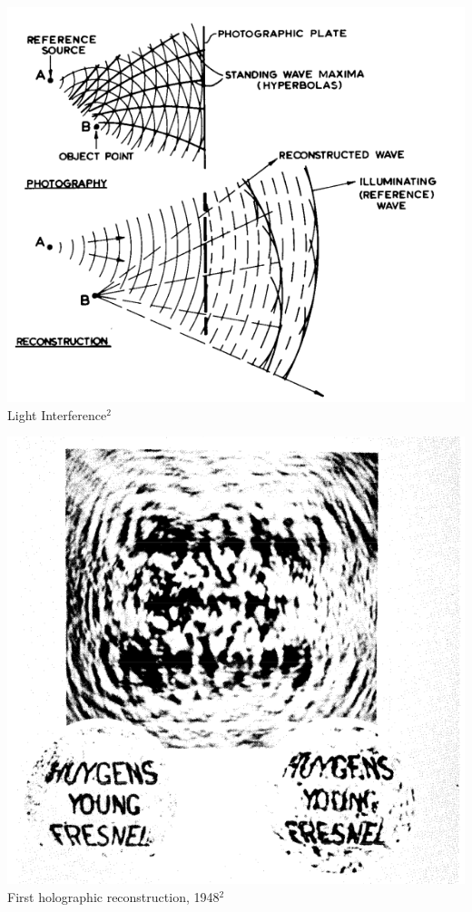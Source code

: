 \documentclass[a0paper,fleqn]{betterposter}
\begin{document}
{{\begin{center}
	\noindent\begin{minipage}[b]{.5\textwidth}
		\includegraphics[width=0.7\linewidth, height=0.2\textheight]{img/img3}
		\newline
		\LARGE Light Interference$^{\text{2}}$
	\end{minipage}%
	\hfill
	\begin{minipage}[b]{.5\linewidth}
		\includegraphics[width=0.7\linewidth, height=0.2\textheight]{img/img2}
		\newline
		\LARGE First holographic reconstruction, 1948$^{\text{2}}$
	\end{minipage}
	
\end{center}

}}
\end{document}
